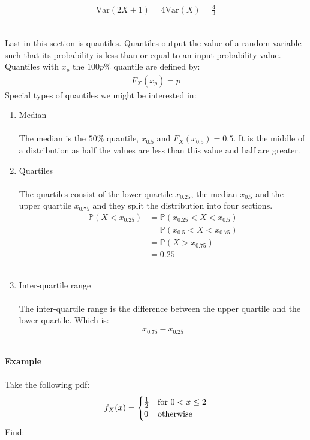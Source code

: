 \documentclass[,oneside]{article}
\begin{document}
\begin{enumerate}
\begin{enumerate}
\begin{align*}
\text{Var}(2X+1)=4\text{Var}(X)=\frac{4}{3}
\end{align*}
\end{enumerate}\\
Last in this section is quantiles. Quantiles output the value of a random variable such that its probability is less than or equal to an input probability value. Quantiles with $x_p$ the $100p\%$ quantile are defined by:
\begin{align*}
F_X(x_p)=p
\end{align*}
Special types of quantiles we might be interested in:
\begin{enumerate}
\item Median\\ \\
The median is the $50\%$ quantile, $x_{0.5}$ and $F_X(x_{0.5})=0.5$. It is the middle of a distribution as half the values are less than this value and half are greater.\\
\item Quartiles\\ \\
The quartiles consist of the lower quartile $x_{0.25}$, the median $x_{0.5}$ and the upper quartile $x_{0.75}$ and they split the distribution into four sections. 
\begin{align*}
\mathbb{P}(X < x_{0.25}) &= \mathbb{P}(x_{0.25} < X < x_{0.5}) \\
&= \mathbb{P}(x_{0.5} < X < x_{0.75}) \\
&= \mathbb{P}(X > x_{0.75})\\
&=0.25
\end{align*}\\
\item Inter-quartile range\\ \\
The inter-quartile range is the difference between the upper quartile and the lower quartile. Which is:
\begin{align*}
x_{0.75}-x_{0.25}
\end{align*}
\end{enumerate}\\ 
\textbf{Example}\\ \\
Take the following pdf:
\[
f_X(x)=
\begin{cases}
\frac{1}{2} & \text{for } 0 < x \leq 2 \\
0 & $otherwise$
\end{cases} \] 
Find:

\end{enumerate}
\end{document}

